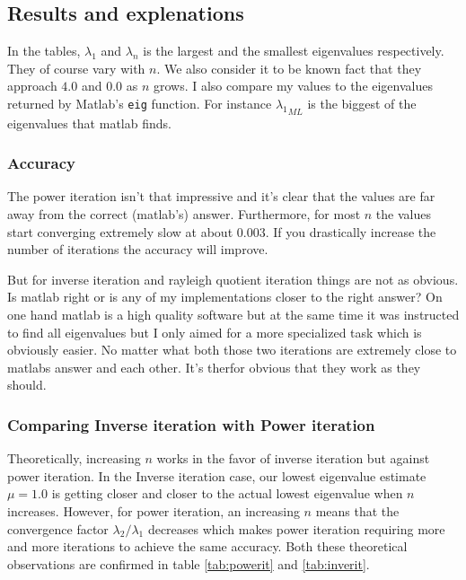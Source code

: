 \documentclass[a4paper,11pt]{article}
\begin{document}
\subsection{Results and explenations}


In the tables, $\lambda_1$ and $\lambda_n$ is the largest and the
smallest eigenvalues respectively. They of course vary with $n$. We also
consider it to be known fact that they approach $4.0$ and $0.0$
as $n$ grows. I also compare my values to the eigenvalues
returned by Matlab's \texttt{eig} function. For instance
${\lambda_1}_{ML}$ is the biggest of the eigenvalues that matlab finds.

\subsubsection{Accuracy}

The power iteration isn't that impressive and it's clear that the values
are far away from the correct (matlab's) answer. Furthermore, for most
$n$ the values start converging extremely slow at about $0.003$. If you
drastically increase the number of iterations the accuracy will improve.

But for inverse iteration and rayleigh quotient iteration things are not
as obvious. Is matlab right or is any of my implementations closer to
the right answer? On one hand matlab is a high quality software but at
the same time it was instructed to find all eigenvalues but I only aimed
for a more specialized task which is obviously easier. No matter what
both those two iterations are extremely close to matlabs answer and each
other. It's therfor obvious that they work as they should.

\subsubsection{Comparing Inverse iteration with Power iteration}

Theoretically, increasing $n$ works in the favor of inverse
iteration but against power iteration. In the Inverse iteration
case, our lowest eigenvalue estimate $\mu=1.0$ is getting closer and
closer to the actual lowest eigenvalue when $n$ increases. However, for
power iteration, an increasing $n$ means that the convergence factor
$\lambda_2/\lambda_1$ decreases which makes power iteration requiring
more and more iterations to achieve the same accuracy. Both these
theoretical observations are confirmed in table \ref{tab:powerit}
and \ref{tab:inverit}.
\end{document}
